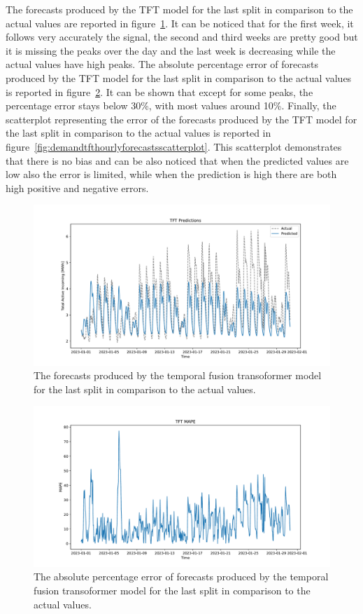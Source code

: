 The forecasts produced by the TFT model for the last split in comparison to the actual values are reported in figure~\ref{fig:demandtfthourlyforecasts}.
It can be noticed that for the first week, it follows very accurately the signal, the second and third weeks are pretty good but it is missing the peaks over the day and the last week is decreasing while the actual values have high peaks.
The absolute percentage error of forecasts produced by the TFT model for the last split in comparison to the actual values is reported in figure~\ref{fig:demandtfthourlyforecastsmape}.
It can be shown that except for some peaks, the percentage error stays below 30\%, with most values around 10\%.
Finally, the scatterplot representing the error of the forecasts produced by the TFT model for the last split in comparison to the actual values is reported in figure~\ref{fig:demandtfthourlyforecastsscatterplot}.
This scatterplot demonstrates that there is no bias and can be also noticed that when the predicted values are low also the error is limited, while when the prediction is high there are both high positive and negative errors.

\begin{figure}[H]
\centering
\includegraphics[width=1\textwidth]{images/demand/TFT}
\caption{The forecasts produced by the temporal fusion transoformer model for the last split in comparison to the actual values.}
\label{fig:demandtfthourlyforecasts}
\end{figure}

\begin{figure}[H]
\centering
\includegraphics[width=1\textwidth]{images/demand/TFT_mape}
\caption{The absolute percentage error of forecasts produced by the temporal fusion transoformer model for the last split in comparison to the actual values.}
\label{fig:demandtfthourlyforecastsmape}
\end{figure}

